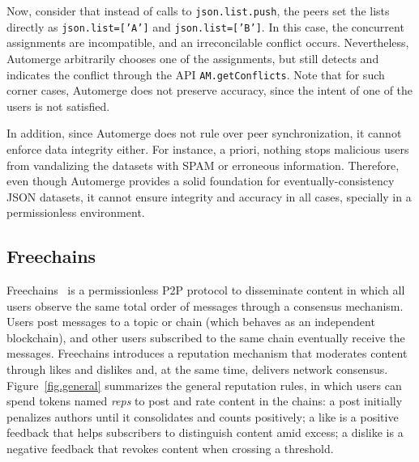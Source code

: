 \documentclass[12pt]{article}
\newcommand{\code}[1]  {\texttt{\footnotesize{#1}}}
\begin{document}
Now, consider that instead of calls to \code{json.list.push}, the peers set the
lists directly as \code{json.list=['A']} and \code{json.list=['B']}.
In this case, the concurrent assignments are incompatible, and an
irreconcilable conflict occurs.
Nevertheless, Automerge arbitrarily chooses one of the assignments, but still
detects and indicates the conflict through the API \code{AM.getConflicts}.
Note that for such corner cases, Automerge does not preserve accuracy, since
the intent of one of the users is not satisfied.

In addition, since Automerge does not rule over peer synchronization, it cannot
enforce data integrity either.
For instance, a priori, nothing stops malicious users from vandalizing the
datasets with SPAM or erroneous information.
%
Therefore, even though Automerge provides a solid foundation for
eventually-consistency JSON datasets, it cannot ensure integrity and accuracy
in all cases, specially in a permissionless environment.

\subsection{Freechains}

Freechains~\cite{fcs.sbseg20} is a permissionless P2P protocol to disseminate
content in which all users observe the same total order of messages through a
consensus mechanism.
%
Users post messages to a topic or chain (which behaves as an independent
blockchain), and other users subscribed to the same chain eventually receive
the messages.
%
Freechains introduces a reputation mechanism that moderates content through
likes and dislikes and, at the same time, delivers network consensus.
%
Figure~\ref{fig.general} summarizes the general reputation rules, in which
users can spend tokens named \emph{reps} to post and rate content in the
chains:
    a post initially penalizes authors until it consolidates and counts positively;
    a like is a positive feedback that helps subscribers to distinguish content amid excess;
    a dislike is a negative feedback that revokes content when crossing a threshold.
\end{document}
